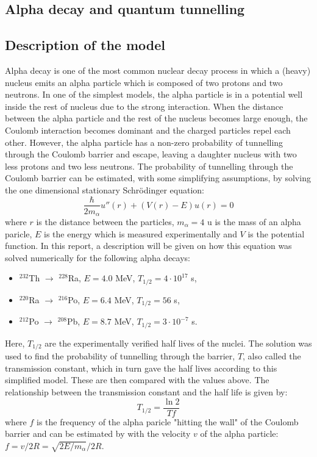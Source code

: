 \documentclass[twocolumn]{article}
\begin{document}
\begin{large}
\section*{Alpha decay and quantum tunnelling}
\subsection*{Description of the model}
Alpha decay is one of the most common nuclear decay process in which a (heavy) nucleus emits an alpha particle which is composed of two protons and two neutrons. In one of the simplest models, the alpha particle is in a potential well inside the rest of nucleus due to the strong interaction. When the distance between the alpha particle and the rest of the nucleus becomes large enough, the Coulomb interaction becomes dominant and the charged particles repel each other. However, the alpha particle has a non-zero probability of tunnelling through the Coulomb barrier and escape, leaving a daughter nucleus with two less protons and two less neutrons. The probability of tunnelling through the Coulomb barrier can be estimated, with some simplifying assumptions, by solving the one dimensional stationary Schrödinger equation:
\begin{equation}
    \label{26mar1229}
    \frac{\hbar}{2m_\alpha}u''(r) + (V(r)-E)u(r) = 0
\end{equation}
where $r$ is the distance between the particles, $m_\alpha=4$ u is the mass of an alpha paricle, $E$ is the energy which is measured experimentally and $V$ is the potential function. In this report, a description will be given on how this equation was solved numerically for the following alpha decays: 
\begin{itemize}
    \item[] $^{232}$Th $\to$ $^{228}$Ra, $E = 4.0$ MeV, $T_{1/2} = 4\cdot 10^{17}$ s,
    \item[] $^{220}$Ra $\to$ $^{216}$Po, $E = 6.4$ MeV, $T_{1/2} = 56$ s,
    \item[] $^{212}$Po $\to$ $^{208}$Pb, $E = 8.7$ MeV, $T_{1/2} = 3\cdot 10^{-7}$ s.
\end{itemize}
Here, $T_{1/2}$ are the experimentally verified half lives of the nuclei. The solution was used to find the probability of tunnelling through the barrier, $T$, also called the transmission constant, which in turn gave the half lives according to this simplified model. These are then compared with the values above. The relationship between the transmission constant and the half life is given by:
\begin{equation}
    \label{28mar2156}
    T_{1/2} = \frac{\ln 2}{Tf}
\end{equation}
where $f$ is the frequency of the alpha paricle "hitting the wall" of the Coulomb barrier and can be estimated by with the velocity $v$ of the alpha particle: $f = v/2R = \sqrt{2E/m_\alpha}/2R$. 


\end{large}
\end{document}
